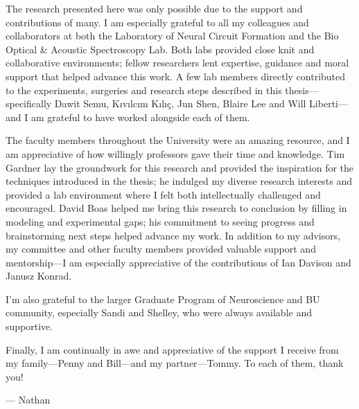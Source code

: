 The research presented here was only possible due to the support and 
contributions of many. I am especially grateful to all my 
colleagues and collaborators at both the Laboratory of Neural 
Circuit Formation and the Bio Optical \& Acoustic Spectroscopy Lab. 
Both labs provided close knit and collaborative environments; 
fellow researchers lent expertise, guidance and moral support 
that helped advance this work. A few lab members directly contributed 
to the experiments, surgeries and research steps described in this 
thesis---specifically Dawit Semu, K{\i}v{\i}lc{\i}m K{\i}l{\i}\c{c}, 
Jun Shen, Blaire Lee and Will Liberti---and I am grateful to have
worked alongside each of them.

The faculty members throughout the University were an amazing resource, and I 
am appreciative of how willingly professors gave their time and 
knowledge. Tim Gardner lay the groundwork for this research and 
provided the inspiration for the techniques introduced in the 
thesis; he indulged my diverse research interests and provided a 
lab environment where I felt both intellectually challenged and 
encouraged. David Boas helped me bring this research to conclusion 
by filling in modeling and experimental gaps; his commitment to 
seeing progress and brainstorming next steps helped advance 
my work. In addition to my advisors, my committee and other 
faculty members provided valuable support and mentorship---I 
am especially appreciative of the contributions of Ian Davison
and Janusz Konrad.

I'm also grateful to the larger Graduate Program of Neuroscience 
and BU community, especially Sandi and Shelley, who were always 
available and supportive.

Finally, I am continually in awe and appreciative of the support 
I receive from my family---Penny and Bill---and my partner---Tommy. 
To each of them, thank you!

--- Nathan

